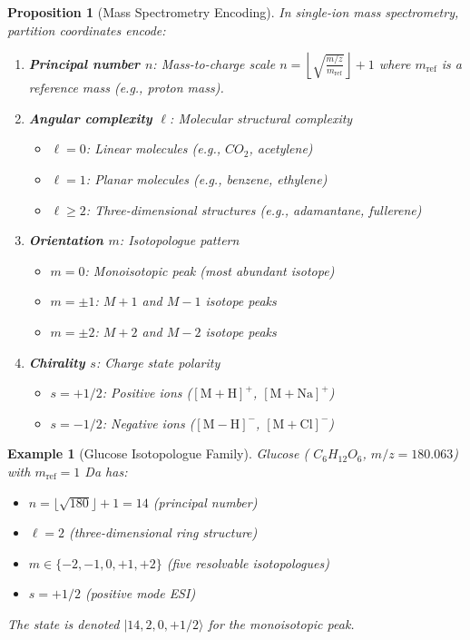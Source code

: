 \documentclass[twocolumn,10pt]{article}
\newtheorem{proposition}[theorem]{Proposition}
\newtheorem{example}[theorem]{Example}
\begin{document}
\begin{proposition}[Mass Spectrometry Encoding]
\label{prop:physical}
In single-ion mass spectrometry, partition coordinates encode:
\begin{enumerate}
    \item \textbf{Principal number $n$}: Mass-to-charge scale
    $
    n = \left\lfloor \sqrt{\frac{m/z}{m_{\mathrm{ref}}}} \right\rfloor + 1
    $
    where $m_{\mathrm{ref}}$ is a reference mass (e.g., proton mass).

    \item \textbf{Angular complexity $\ell$}: Molecular structural complexity
    \begin{itemize}
        \item $\ell = 0$: Linear molecules (e.g., $CO_2$, acetylene)
        \item $\ell = 1$: Planar molecules (e.g., benzene, ethylene)
        \item $\ell \geq 2$: Three-dimensional structures (e.g., adamantane, fullerene)
    \end{itemize}

    \item \textbf{Orientation $m$}: Isotopologue pattern
    \begin{itemize}
        \item $m = 0$: Monoisotopic peak (most abundant isotope)
        \item $m = \pm 1$: $M+1$ and $M-1$ isotope peaks
        \item $m = \pm 2$: $M+2$ and $M-2$ isotope peaks
    \end{itemize}

    \item \textbf{Chirality $s$}: Charge state polarity
    \begin{itemize}
        \item $s = +1/2$: Positive ions ($[\mathrm{M}+\mathrm{H}]^+$, $[\mathrm{M}+\mathrm{Na}]^+$)
        \item $s = -1/2$: Negative ions ($[\mathrm{M}-\mathrm{H}]^-$, $[\mathrm{M}+\mathrm{Cl}]^-$)
    \end{itemize}
\end{enumerate}
\end{proposition}

\begin{example}[Glucose Isotopologue Family]
\label{ex:glucose}
Glucose ( $C_6H_{12}O_6$, $m/z = 180.063$) with $m_{\mathrm{ref}} = 1$ Da has:
\begin{itemize}
    \item $n = \lfloor \sqrt{180} \rfloor + 1 = 14$ (principal number)
    \item $\ell = 2$ (three-dimensional ring structure)
    \item $m \in \{-2, -1, 0, +1, +2\}$ (five resolvable isotopologues)
    \item $s = +1/2$ (positive mode ESI)
\end{itemize}
The state is denoted $|14, 2, 0, +1/2\rangle$ for the monoisotopic peak.
\end{example}
\end{document}
